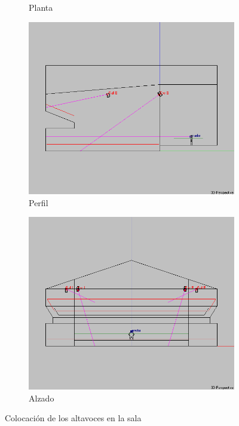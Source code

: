\documentclass{article}
\begin{document}
\begin{figure}[H]
\begin{subfigure}[b]{0.45\linewidth}
        \caption{Planta}
        \label{fig:alzado}
    \end{subfigure}
    \begin{subfigure}[b]{0.45\linewidth}
        \includegraphics[width=\linewidth]{Para la memoria/Plano lateral.png}
        \caption{Perfil}
        \label{fig:perfil}
    \end{subfigure}
    \begin{subfigure}[b]{0.45\linewidth}
        \includegraphics[width=\linewidth]{Para la memoria/Plano frontal.png}
        \caption{Alzado}
        \label{fig:alzado}
    \end{subfigure}
    \caption{Colocación de los altavoces en la sala}
    \label{fig:disposicion}
\end{figure}
\end{document}
